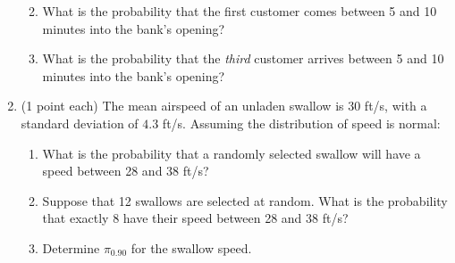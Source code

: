 \documentclass[11pt]{article}
\newenvironment{solution}
  {\textit{Solution.}}
\newcommand{\sol}[1]{
    \begin{customframedproof}[linecolor=orangehdx!75,]
        \begin{solution}
        #1
        \end{solution}
    \end{customframedproof}
}
\begin{document}
\begin{enumerate}
\begin{enumerate}
{		}
		\item What is the probability that the first customer comes between 5 and 10 minutes into the bank's opening?
		\sol{

		}
		\item What is the probability that the \textit{third} customer arrives between 5 and 10 minutes into the bank's opening?
		\sol{

		}
	\end{enumerate}
\newpage
	\item (1 point each) The mean airspeed of an unladen swallow is 30 ft/s, with a standard deviation of \(4.3\) ft/s. Assuming the distribution of speed is normal:
	\begin{enumerate}
		\item What is the probability that a randomly selected swallow will have a speed between 28 and 38 ft/s?
		\sol{

		}
		\item Suppose that 12 swallows are selected at random. What is the probability that exactly 8 have their speed between 28 and 38 ft/s?
		\sol{

		}
		\item Determine \(\pi_{0.90}\) for the swallow speed.
		\sol{

		}
	\end{enumerate}
\end{enumerate}
\end{document}

